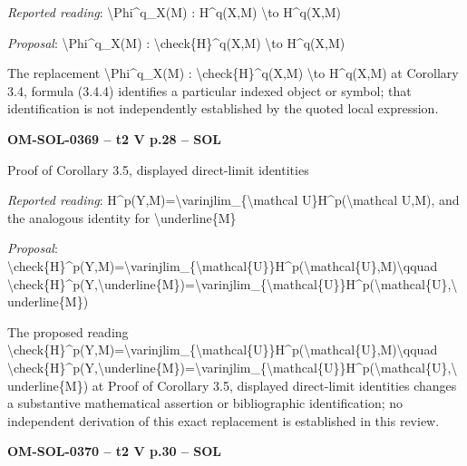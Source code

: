 \emph{Reported reading}: \textbackslash{}Phi\textasciicircum{}q\_X(M) : H\textasciicircum{}q(X,M) \textbackslash{}to H\textasciicircum{}q(X,M)\par
\emph{Proposal}: \textbackslash{}Phi\textasciicircum{}q\_X(M) : \textbackslash{}check\{H\}\textasciicircum{}q(X,M) \textbackslash{}to H\textasciicircum{}q(X,M)\par
The replacement \textbackslash{}Phi\textasciicircum{}q\_X(M) : \textbackslash{}check\{H\}\textasciicircum{}q(X,M) \textbackslash{}to H\textasciicircum{}q(X,M) at Corollary 3.4, formula (3.4.4) identifies a particular indexed object or symbol; that identification is not independently established by the quoted local expression.\par
\par\noindent\textbf{OM-SOL-0369 -- t2 V p.28 -- SOL}\par
Proof of Corollary 3.5, displayed direct-limit identities\par
\emph{Reported reading}: H\textasciicircum{}p(Y,M)=\allowbreak \textbackslash{}varinjlim\_\{\textbackslash{}mathcal U\}H\textasciicircum{}p(\textbackslash{}mathcal U,M), and the analogous identity for \textbackslash{}underline\{M\}\par
\emph{Proposal}: \textbackslash{}check\{H\}\textasciicircum{}p(Y,M)=\allowbreak \textbackslash{}varinjlim\_\{\textbackslash{}mathcal\{U\}\}H\textasciicircum{}p(\textbackslash{}mathcal\{U\},M)\textbackslash{}qquad \textbackslash{}check\{H\}\textasciicircum{}p(Y,\textbackslash{}underline\{M\})=\allowbreak \textbackslash{}varinjlim\_\{\textbackslash{}mathcal\{U\}\}H\textasciicircum{}p(\textbackslash{}mathcal\{U\},\textbackslash{}underline\{M\})\par
The proposed reading \textbackslash{}check\{H\}\textasciicircum{}p(Y,M)=\allowbreak \textbackslash{}varinjlim\_\{\textbackslash{}mathcal\{U\}\}H\textasciicircum{}p(\textbackslash{}mathcal\{U\},M)\textbackslash{}qquad \textbackslash{}check\{H\}\textasciicircum{}p(Y,\textbackslash{}underline\{M\})=\allowbreak \textbackslash{}varinjlim\_\{\textbackslash{}mathcal\{U\}\}H\textasciicircum{}p(\textbackslash{}mathcal\{U\},\textbackslash{}underline\{M\}) at Proof of Corollary 3.5, displayed direct-limit identities changes a substantive mathematical assertion or bibliographic identification; no independent derivation of this exact replacement is established in this review.\par
\par\noindent\textbf{OM-SOL-0370 -- t2 V p.30 -- SOL}\par
